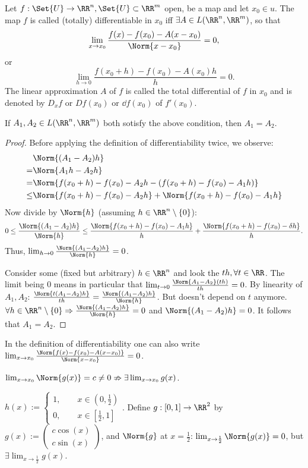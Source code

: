 \begin{defn}
 Let $f:\Set{U}\to\RR^n, \Set{U}\subset\RR^m$ open, be a map and let $x_0\in u$. The map $f$ is called (totally) differentiable in $x_0$ iff $\exists A\in L(\RR^n,\RR^m)$, so that $$\lim_{x\to x_0}\frac{f(x)-f(x_0)-A(x-x_0)}{\Norm{x-x_0}}=0,$$ or $$\lim_{h\to 0}\frac{f(x_0+h)-f(x_0)-A(x_0)h}{h}=0.$$ 
 The linear approximation $A$ of $f$ is called the total differential of $f$ in $x_0$ and is denoted by $D_x f$ or $D f(x_0)$ or $\dd f(x_0)$ of $f'(x_0)$. 
\end{defn}
\begin{lem}[Uniqueness]
 If $A_1, A_2\in L(\RR^n,\RR^m)$ both sotisfy the above condition, then $A_1=A_2$.
\end{lem}
\begin{proof}
 Before applying the definition of differentiability twice, we observe:
 \begin{align*}
  &\Norm{(A_1-A_2)h}\\=&\Norm{A_1h-A_2h}\\=&\Norm{f(x_0+h)-f(x_0)-A_2h-(f(x_0+h)-f(x_0)-A_1 h)}\\\leq&\Norm{f(x_0+h)-f(x_0)-A_2h}+\Norm{f(x_0+h)-f(x_0)-A_1h}
 \end{align*}
 Now divide by $\Norm{h}$ (assuming $h\in\RR^n\setminus\{0\}$):
 $$0\leq\frac{\Norm{(A_1-A_2)h}}{\Norm{h}}\leq\frac{\Norm{f(x_0+h)-f(x_0)-A_1h}}{h}+\frac{\Norm{f(x_0+h)-f(x_0)-\delta h}}{h}.$$ Thus, $\lim_{h\to 0}\frac{\Norm{(A_1-A_2)h}}{\Norm{h}}=0$.
 
 Consider some (fixed but arbitrary) $h\in\RR^n$ and look the $th, \forall t\in\RR$. The limit being 0 means in particular that $\lim_{t\to 0}\frac{\Norm{A_1-A_2}(t h)}{th}=0$. By linearity of $A_1, A_2$:
 $\frac{\Norm{t(A_1-A_2)h}}{th}=\frac{\Norm{(A_1-A_2)h}}{\Norm{h}}$. But doesn't depend on $t$ anymore. $\forall h\in\RR^n\setminus\{0\}\Rightarrow\frac{\Norm{(A_1-A_2)h}}{\Norm{h}}=0$ and $\Norm{(A_1-A_2)h}=0$. It follows that $A_1=A_2$.
\end{proof}
\begin{rem}
 In the definition of differentiability one can also write $\lim_{x\to x_0} \linebreak[4]\frac{\Norm{f(x)-f(x_0)-A(x-x_0)}}{\Norm{x-x_0}}=0$.
\end{rem}
\begin{rem}
 $\lim_{x\to x_0}\Norm{g(x)}=c\neq 0\nRightarrow \exists\lim_{x\to x_0}g(x)$.
\end{rem}
\begin{countEx}
 $h(x):=\begin{cases}1,\qquad x\in(0,\frac{1}{2})\\0,\qquad x\in[\frac{1}{2},1]\end{cases}$. Define $g:[0,1]\to\RR^2$ by $g(x):=\left(\begin{matrix}c\cos(x)\\c\sin(x)\end{matrix}\right)$, and $\Norm{g}$ at $x=\frac{1}{2}$: $\lim_{x\to\frac{1}{2}}\Norm{g(x)}=0$, but $\exists \lim_{x\to\frac{1}{2}}g(x)$.
\end{countEx}
